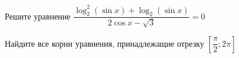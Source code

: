 \begin{ex}
	\begin{condition}
		\begin{enumcols}[label=\asbuk*)]
			\item Решите уравнение \( \dfrac{\log_2^2{(\sin x)} +\log_2 {(\sin x)}}{2\cos x -\sqrt{3}} = 0 \)
			\item Найдите все корни уравнения, принадлежащие отрезку \(  \left[\dfrac{\pi}{2};2\pi\right] \)
		\end{enumcols}
	\end{condition}
\end{ex}